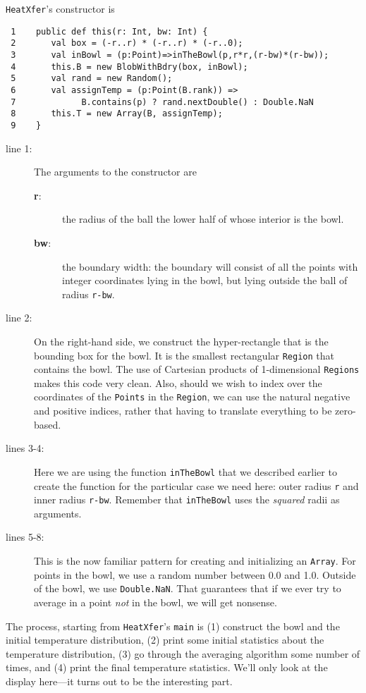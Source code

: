 {\tt HeatXfer}'s constructor is 
\begin{verbatim}
 1    public def this(r: Int, bw: Int) {
 2       val box = (-r..r) * (-r..r) * (-r..0);
 3       val inBowl = (p:Point)=>inTheBowl(p,r*r,(r-bw)*(r-bw));
 4       this.B = new BlobWithBdry(box, inBowl);
 5       val rand = new Random();
 6       val assignTemp = (p:Point(B.rank)) =>
 7             B.contains(p) ? rand.nextDouble() : Double.NaN
 8       this.T = new Array(B, assignTemp);
 9    }  
\end{verbatim}
\begin{description}
\item[line 1:]  The arguments to the constructor are
\begin{description}
\item[{\bf r}:] the radius of the ball the lower half of whose interior is the
bowl.
\item[{\bf bw}:] the boundary width: the boundary will consist of all the points
with integer coordinates lying in the bowl, but lying outside the ball of radius
{\tt r-bw}.
\end{description}
\item[line 2:] On the right-hand side, we construct the hyper-rectangle that is
the bounding box for the bowl. It is the smallest rectangular {\tt Region} that
contains the bowl.  The use of Cartesian products of 1-dimensional {\tt Regions}
makes this code very clean.  Also, should we wish to index over the
coordinates of the {\tt Points} in the {\tt Region}, we can use the natural
negative and positive indices, rather that having to translate everything to
be zero-based.
\item[lines 3-4:] Here we are using the function {\tt inTheBowl} that we
described earlier to create the function for the particular case we need here:
outer radius {\tt r} and inner radius {\tt r-bw}.  Remember that {\tt inTheBowl}
uses the {\em squared} radii as arguments.
\item[lines 5-8:] This is the now familiar pattern for creating and initializing
an {\tt Array}.  For points in the bowl, we use a random number between 0.0 and
1.0.  Outside of the bowl, we use {\tt Double.NaN}.  That guarantees
that if we ever try to average in a point {\em not} in the bowl, we will get
nonsense.
\end{description}
The process, starting from {\tt HeatXfer}'s {\tt main} is (1) construct the
bowl and the initial temperature distribution, (2) print some initial
statistics about the temperature distribution, (3) go through the averaging
algorithm some number of times, and (4) print the final temperature statistics.
We'll only look at the display here---it turns out to be the interesting part.

